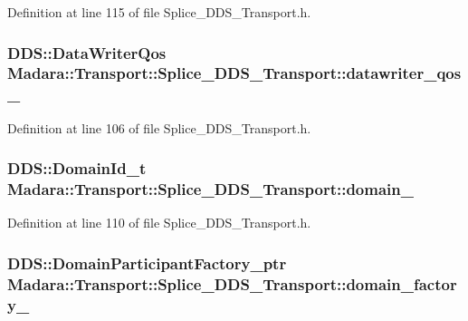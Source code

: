 Definition at line 115 of file Splice\_\-DDS\_\-Transport.h.

\hypertarget{classMadara_1_1Transport_1_1Splice__DDS__Transport_a0bff6e853ea4b323063c61d461108f0b}{
\subsubsection[{datawriter\_\-qos\_\-}]{\setlength{\rightskip}{0pt plus 5cm}DDS::DataWriterQos {\bf Madara::Transport::Splice\_\-DDS\_\-Transport::datawriter\_\-qos\_\-}}}
\label{d0/d91/classMadara_1_1Transport_1_1Splice__DDS__Transport_a0bff6e853ea4b323063c61d461108f0b}


Definition at line 106 of file Splice\_\-DDS\_\-Transport.h.

\hypertarget{classMadara_1_1Transport_1_1Splice__DDS__Transport_ad4baf77a65e9c4482f316e34a50f63f7}{
\subsubsection[{domain\_\-}]{\setlength{\rightskip}{0pt plus 5cm}DDS::DomainId\_\-t {\bf Madara::Transport::Splice\_\-DDS\_\-Transport::domain\_\-}}}
\label{d0/d91/classMadara_1_1Transport_1_1Splice__DDS__Transport_ad4baf77a65e9c4482f316e34a50f63f7}


Definition at line 110 of file Splice\_\-DDS\_\-Transport.h.

\hypertarget{classMadara_1_1Transport_1_1Splice__DDS__Transport_a15644b7cf6856d20688247ccf29d6770}{
\subsubsection[{domain\_\-factory\_\-}]{\setlength{\rightskip}{0pt plus 5cm}DDS::DomainParticipantFactory\_\-ptr {\bf Madara::Transport::Splice\_\-DDS\_\-Transport::domain\_\-factory\_\-}}}
\label{d0/d91/classMadara_1_1Transport_1_1Splice__DDS__Transport_a15644b7cf6856d20688247ccf29d6770}


